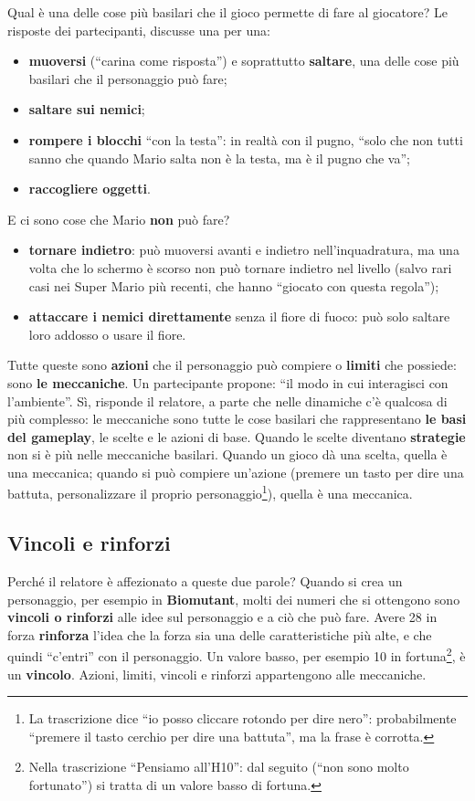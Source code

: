 Qual è una delle cose più basilari che il gioco permette di fare al giocatore?
Le risposte dei partecipanti, discusse una per una:
\begin{itemize}
  \item \textbf{muoversi} (``carina come risposta'') e soprattutto
        \textbf{saltare}, una delle cose più basilari che il personaggio può
        fare;
  \item \textbf{saltare sui nemici};
  \item \textbf{rompere i blocchi} ``con la testa'': in realtà con il pugno,
        ``solo che non tutti sanno che quando Mario salta non è la testa, ma è
        il pugno che va'';
  \item \textbf{raccogliere oggetti}.
\end{itemize}
E ci sono cose che Mario \textbf{non} può fare?
\begin{itemize}
  \item \textbf{tornare indietro}: può muoversi avanti e indietro nell'inquadratura,
        ma una volta che lo schermo è scorso non può tornare indietro nel
        livello (salvo rari casi nei Super Mario più recenti, che hanno
        ``giocato con questa regola'');
  \item \textbf{attaccare i nemici direttamente} senza il fiore di fuoco: può
        solo saltare loro addosso o usare il fiore.
\end{itemize}
Tutte queste sono \textbf{azioni} che il personaggio può compiere o
\textbf{limiti} che possiede: sono \textbf{le meccaniche}. Un partecipante
propone: ``il modo in cui interagisci con l'ambiente''. Sì, risponde il
relatore, a parte che nelle dinamiche c'è qualcosa di più complesso: le
meccaniche sono tutte le cose basilari che rappresentano \textbf{le basi del
gameplay}, le scelte e le azioni di base. Quando le scelte diventano
\textbf{strategie} non si è più nelle meccaniche basilari. Quando un gioco dà una
scelta, quella è una meccanica; quando si può compiere un'azione (premere un
tasto per dire una battuta, personalizzare il proprio personaggio\footnote{La
trascrizione dice ``io posso cliccare rotondo per dire nero'': probabilmente
``premere il tasto cerchio per dire una battuta'', ma la frase è corrotta.}),
quella è una meccanica.

\subsection{Vincoli e rinforzi}

Perché il relatore è affezionato a queste due parole? Quando si crea un
personaggio, per esempio in \textbf{Biomutant}, molti dei numeri che si ottengono
sono \textbf{vincoli o rinforzi} alle idee sul personaggio e a ciò che può fare.
Avere 28 in forza \textbf{rinforza} l'idea che la forza sia una delle
caratteristiche più alte, e che quindi ``c'entri'' con il personaggio. Un valore
basso, per esempio 10 in fortuna\footnote{Nella trascrizione ``Pensiamo
all'H10'': dal seguito (``non sono molto fortunato'') si tratta di un valore
basso di fortuna.}, è un \textbf{vincolo}. Azioni, limiti, vincoli e rinforzi
appartengono alle meccaniche.

